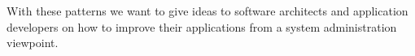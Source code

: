 
With these patterns we want to give ideas to software architects and application developers on how to improve their applications from a system administration viewpoint. 

